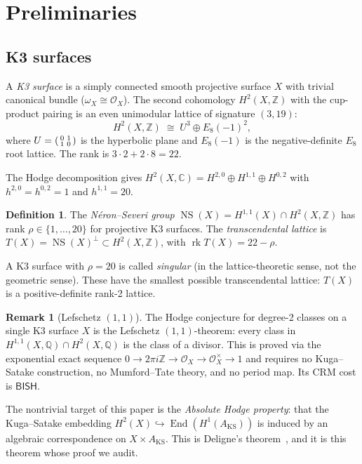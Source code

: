 \documentclass[11pt,a4paper]{article}
\theoremstyle{plain}
\theoremstyle{definition}
\newtheorem{definition}[theorem]{Definition}
\newtheorem{remark}[theorem]{Remark}
\newcommand{\BISH}{\textsf{BISH}}
\newcommand{\Z}{\mathbb{Z}}
\newcommand{\Q}{\mathbb{Q}}
\newcommand{\C}{\mathbb{C}}
\DeclareMathOperator{\End}{End}
\DeclareMathOperator{\NS}{NS}
\DeclareMathOperator{\rk}{rk}
\begin{document}
\section{Preliminaries}\label{sec:prelim}

\subsection{K3 surfaces}

A \emph{K3 surface} is a simply connected smooth projective surface $X$ with trivial canonical bundle ($\omega_X \cong \mathcal{O}_X$). The second cohomology $H^2(X,\Z)$ with the cup-product pairing is an even unimodular lattice of signature $(3,19)$:
\begin{equation}\label{eq:k3-lattice}
  H^2(X,\Z) \;\cong\; U^3 \oplus E_8(-1)^2,
\end{equation}
where $U = \begin{psmallmatrix} 0 & 1 \\ 1 & 0 \end{psmallmatrix}$ is the hyperbolic plane and $E_8(-1)$ is the negative-definite $E_8$ root lattice. The rank is $3 \cdot 2 + 2 \cdot 8 = 22$.

The Hodge decomposition gives $H^2(X,\C) = H^{2,0} \oplus H^{1,1} \oplus H^{0,2}$ with $h^{2,0} = h^{0,2} = 1$ and $h^{1,1} = 20$.

\begin{definition}
The \emph{N\'eron--Severi group} $\NS(X) = H^{1,1}(X) \cap H^2(X,\Z)$ has rank $\rho \in \{1, \ldots, 20\}$ for projective K3 surfaces. The \emph{transcendental lattice} is $T(X) = \NS(X)^\perp \subset H^2(X,\Z)$, with $\rk T(X) = 22 - \rho$.
\end{definition}

A K3 surface with $\rho = 20$ is called \emph{singular} (in the lattice-theoretic sense, not the geometric sense). These have the smallest possible transcendental lattice: $T(X)$ is a positive-definite rank-2 lattice.

\begin{remark}[Lefschetz $(1,1)$]\label{rem:lefschetz}
The Hodge conjecture for degree-2 classes on a single K3 surface $X$ is the Lefschetz $(1,1)$-theorem: every class in $H^{1,1}(X,\Q) \cap H^2(X,\Q)$ is the class of a divisor. This is proved via the exponential exact sequence $0 \to 2\pi i\Z \to \mathcal{O}_X \to \mathcal{O}_X^\times \to 1$ and requires no Kuga--Satake construction, no Mumford--Tate theory, and no period map. Its CRM cost is $\BISH$.

The nontrivial target of this paper is the \emph{Absolute Hodge property}: that the Kuga--Satake embedding $H^2(X) \hookrightarrow \End(H^1(A_{\mathrm{KS}}))$ is induced by an algebraic correspondence on $X \times A_{\mathrm{KS}}$. This is Deligne's theorem~\cite{deligne-k3}, and it is this theorem whose proof we audit.
\end{remark}
\end{document}
